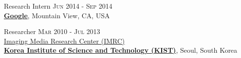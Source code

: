 \documentclass[letterpaper,10pt]{article} %
\newcommand{\blankline}{\quad\pagebreak[2]}
\begin{document}
{%

Research Intern \hfill{\textsc{Jun 2014 - Sep 2014}}\\
\href{http://www.google.com}{\textbf{Google}}, Mountain View, CA, USA


Researcher \hfill{\textsc{Mar 2010 - Jul 2013}}\\
\href{https://www.imrc.kist.re.kr/en/}{Imaging Media Research Center (IMRC)}\\
\href{https://eng.kist.re.kr/}{\textbf{Korea Institute of Science and Technology (KIST)}}, Seoul, South Korea\\
%		
%		
%		
%		
\blankline

}
\end{document}
